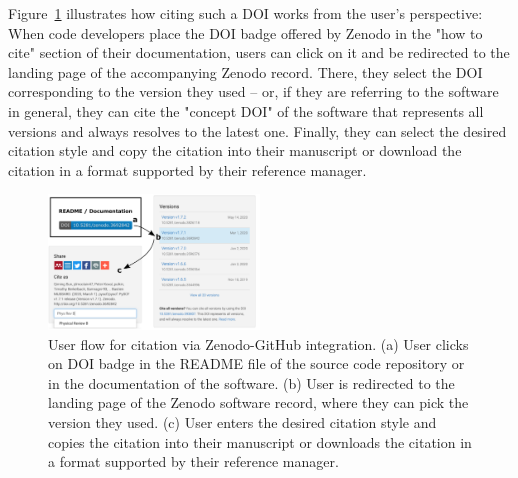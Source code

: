 \documentclass[9pt,review]{livecoms}
\begin{document}
Figure~\ref{fig:zenodo-github} illustrates how citing such a DOI works from the user's perspective:
When code developers place the DOI badge offered by Zenodo in the "how to cite" section of their documentation, users can click on it and be redirected to the landing page of the accompanying Zenodo record.
There, they select the DOI corresponding to the version they used -- or, if they are referring to the software in general, they can cite the "concept DOI" of the software that represents all versions and always resolves to the latest one.
Finally, they can select the desired citation style and copy the citation into their manuscript or download the citation in a format supported by their reference manager.

\begin{figure}
    \includegraphics[width=0.5\textwidth]{figures/zenodo-github}
    \caption{
        User flow for citation via Zenodo-GitHub integration.
        (a) User clicks on DOI badge in the README file of the source code repository or in the documentation of the software.
        (b) User is redirected to the landing page of the Zenodo software record, where they can pick the version they used.
        (c) User enters the desired citation style and copies the citation \cite{Sun2020c} into their manuscript or downloads the citation in a format supported by their reference manager.
    }
    \label{fig:zenodo-github}
\end{figure}


%  
%  
%  
\end{document}
